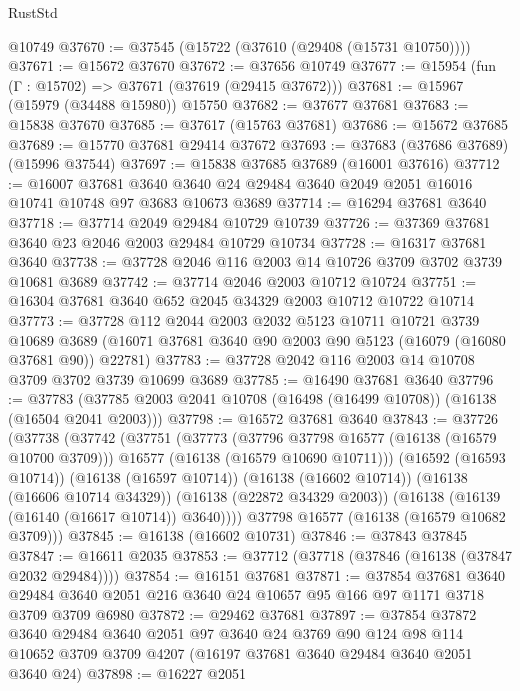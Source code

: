 \begin{lexlean}{RustStd}
\begin{coremodule}
    @10749
@37670 := @37545 (@15722 (@37610 (@29408 (@15731 @10750))))
@37671 := @15672 @37670
@37672 := @37656 @10749
@37677 := @15954 (fun (Γ : @15702) => @37671 (@37619 (@29415 @37672)))
@37681 := @15967 (@15979 (@34488 @15980)) @15750
@37682 := @37677 @37681
@37683 := @15838 @37670
@37685 := @37617 (@15763 @37681)
@37686 := @15672 @37685
@37689 := @15770 @37681 @29414 @37672
@37693 := @37683 (@37686 @37689) (@15996 @37544)
@37697 := @15838 @37685 @37689 (@16001 @37616)
@37712 := @16007
    @37681
    @3640
    @3640
    @24
    @29484
    @3640
    @2049
    @2051
    @16016
    @10741
    @10748
    @97
    @3683
    @10673
    @3689
@37714 := @16294 @37681 @3640
@37718 := @37714 @2049 @29484 @10729 @10739
@37726 := @37369 @37681 @3640 @23 @2046 @2003 @29484 @10729 @10734
@37728 := @16317 @37681 @3640
@37738 := @37728 @2046 @116 @2003 @14 @10726 @3709 @3702 @3739 @10681 @3689
@37742 := @37714 @2046 @2003 @10712 @10724
@37751 := @16304 @37681 @3640 @652 @2045 @34329 @2003 @10712 @10722 @10714
@37773 := @37728
    @112
    @2044
    @2003
    @2032
    @5123
    @10711
    @10721
    @3739
    @10689
    @3689
    (@16071 @37681 @3640 @90 @2003 @90 @5123 (@16079 (@16080 @37681 @90)) @22781)
@37783 := @37728 @2042 @116 @2003 @14 @10708 @3709 @3702 @3739 @10699 @3689
@37785 := @16490 @37681 @3640
@37796 := @37783 (@37785 @2003 @2041 @10708 (@16498 (@16499 @10708)) (@16138 (@16504 @2041 @2003)))
@37798 := @16572 @37681 @3640
@37843 := @37726
    (@37738
      (@37742
        (@37751
          (@37773
            (@37796 @37798 @16577 (@16138 (@16579 @10700 @3709)))
            @16577
            (@16138 (@16579 @10690 @10711)))
          (@16592 (@16593 @10714))
          (@16138 (@16597 @10714))
          (@16138 (@16602 @10714))
          (@16138 (@16606 @10714 @34329))
          (@16138 (@22872 @34329 @2003))
          (@16138 (@16139 (@16140 (@16617 @10714)) @3640))))
      @37798
      @16577
      (@16138 (@16579 @10682 @3709)))
@37845 := @16138 (@16602 @10731)
@37846 := @37843 @37845
@37847 := @16611 @2035
@37853 := @37712 (@37718 (@37846 (@16138 (@37847 @2032 @29484))))
@37854 := @16151 @37681
@37871 := @37854
    @37681
    @3640
    @29484
    @3640
    @2051
    @216
    @3640
    @24
    @10657
    @95
    @166
    @97
    @1171
    @3718
    @3709
    @3709
    @6980
@37872 := @29462 @37681
@37897 := @37854
    @37872
    @3640
    @29484
    @3640
    @2051
    @97
    @3640
    @24
    @3769
    @90
    @124
    @98
    @114
    @10652
    @3709
    @3709
    @4207
    (@16197 @37681 @3640 @29484 @3640 @2051 @3640 @24)
@37898 := @16227 @2051

\end{coremodule}
\end{lexlean}
